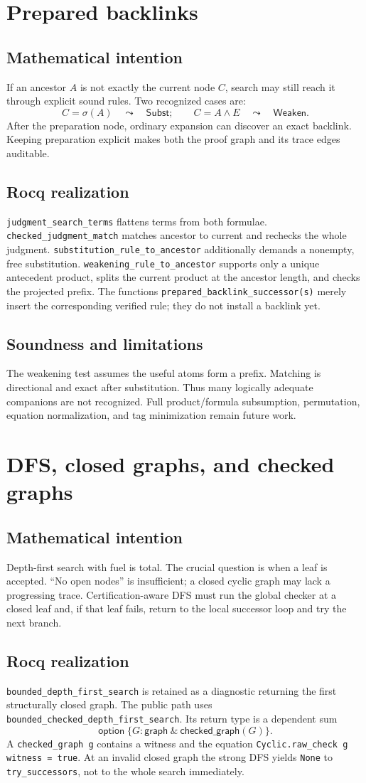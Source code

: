 \documentclass[11pt,oneside]{book}
\DeclareRobustCommand{\code}[1]{\nolinkurl{#1}}
\newcommand{\mathintent}{\subsection*{Mathematical intention}}
\newcommand{\rocqreal}{\subsection*{Rocq realization}}
\newcommand{\soundlim}{\subsection*{Soundness and limitations}}
\begin{document}
\section{Prepared backlinks}

\mathintent

If an ancestor \(A\) is not exactly the current node \(C\), search may still
reach it through explicit sound rules.  Two recognized cases are:
\[
 C=\sigma(A) \quad\leadsto\quad \mathsf{Subst};
 \qquad
 C=A\land E \quad\leadsto\quad \mathsf{Weaken}.
\]
After the preparation node, ordinary expansion can discover an exact
backlink.  Keeping preparation explicit makes both the proof graph and its
trace edges auditable.

\rocqreal

\code{judgment_search_terms} flattens terms from both formulae.
\code{checked_judgment_match} matches ancestor to current and rechecks the
whole judgment.  \code{substitution_rule_to_ancestor} additionally demands a
nonempty, free substitution.  \code{weakening_rule_to_ancestor} supports only
a unique antecedent product, splits the current product at the ancestor
length, and checks the projected prefix.  The functions
\code{prepared_backlink_successor(s)} merely insert the corresponding verified
rule; they do not install a backlink yet.

\soundlim

The weakening test assumes the useful atoms form a prefix.  Matching is
directional and exact after substitution.  Thus many logically adequate
companions are not recognized.  Full product/formula subsumption, permutation,
equation normalization, and tag minimization remain future work.

\section{DFS, closed graphs, and checked graphs}

\mathintent

Depth-first search with fuel is total.  The crucial question is when a leaf is
accepted.  ``No open nodes'' is insufficient; a closed cyclic graph may lack a
progressing trace.  Certification-aware DFS must run the global checker at a
closed leaf and, if that leaf fails, return to the local successor loop and try
the next branch.

\rocqreal

\code{bounded_depth_first_search} is retained as a diagnostic returning the
first structurally closed graph.  The public path uses
\code{bounded_checked_depth_first_search}.  Its return type is a dependent sum
\[
 \mathsf{option}\;\{G:\mathsf{graph}\ \&\
                       \mathsf{checked\_graph}(G)\}.
\]
A \code{checked_graph g} contains a witness and the equation
\code{Cyclic.raw_check g witness = true}.  At an invalid closed graph the
strong DFS yields \code{None} to \code{try_successors}, not to the whole search
immediately.
\end{document}
